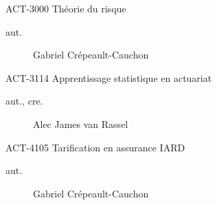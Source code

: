 \documentclass[10pt, french]{article}
\begin{document}
\begin{multicols*}{2}
\begin{contrib}{ACT-3000\: Théorie du risque}
\begin{description}
	\item[aut.] Gabriel Crépeault-Cauchon 
\end{description}
\end{contrib}

\begin{contrib}{ACT-3114\: Apprentissage statistique en actuariat}
\begin{description}
	\item[aut., cre.] Alec James van Rassel
\end{description}
\end{contrib}

\begin{contrib}{ACT-4105\: Tarification en assurance IARD}
\begin{description}
	\item[aut.] Gabriel Crépeault-Cauchon 
\end{description}
\end{contrib}

\end{multicols*}
\end{document}
